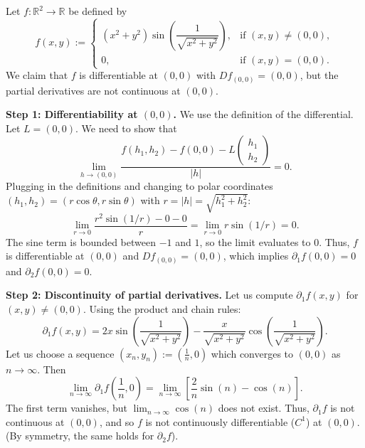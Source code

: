 \begin{example}
\label{ex:differentiable_not_c1}
Let $f : \mathbb{R}^2 \to \mathbb{R}$ be defined by
\[
f(x,y) := \begin{cases}
  (x^2+y^2)\sin\left(\dfrac{1}{\sqrt{x^2+y^2}}\right), & \text{if } (x,y) \neq (0,0), \\
  0, & \text{if } (x,y) = (0,0).
\end{cases}
\]
We claim that $f$ is differentiable at $(0,0)$ with $Df_{(0,0)} = (0, 0)$, but the partial derivatives are not continuous at $(0,0)$. 

\textbf{Step 1: Differentiability at $(0,0)$.} We use the definition of the differential. Let $L = (0, 0)$. We need to show that
\[
  \lim_{h \to (0,0)} \frac{f(h_1, h_2) - f(0,0) - L\begin{pmatrix}h_1\\h_2\end{pmatrix}}{|h|} = 0.
\]
Plugging in the definitions and changing to polar coordinates $(h_1, h_2) = (r\cos\theta, r\sin\theta)$ with $r = |h| = \sqrt{h_1^2+h_2^2}$:
\[
  \lim_{r \to 0} \frac{r^2 \sin(1/r) - 0 - 0}{r} = \lim_{r \to 0} r \sin(1/r) = 0.
\]
The sine term is bounded between $-1$ and $1$, so the limit evaluates to $0$. Thus, $f$ is differentiable at $(0,0)$ and $Df_{(0,0)} = (0, 0)$, which implies $\partial_1 f(0,0) = 0$ and $\partial_2 f(0,0) = 0$.

\textbf{Step 2: Discontinuity of partial derivatives.} Let us compute $\partial_1 f(x,y)$ for $(x,y) \neq (0,0)$. Using the product and chain rules:
\[
  \partial_1 f(x,y) = 2x \sin\left(\frac{1}{\sqrt{x^2+y^2}}\right) - \frac{x}{\sqrt{x^2+y^2}} \cos\left(\frac{1}{\sqrt{x^2+y^2}}\right).
\]
Let us choose a sequence $(x_n, y_n) := (\frac{1}{n}, 0)$ which converges to $(0,0)$ as $n \to \infty$. Then
\[
  \lim_{n \to \infty} \partial_1 f\left(\frac{1}{n}, 0\right) = \lim_{n \to \infty} \left[ \frac{2}{n} \sin(n) - \cos(n) \right].
\]
The first term vanishes, but $\lim_{n \to \infty} \cos(n)$ does not exist. Thus, $\partial_1 f$ is not continuous at $(0,0)$, and so $f$ is not continuously differentiable ($C^1$) at $(0,0)$. (By symmetry, the same holds for $\partial_2 f$).
\end{example}




